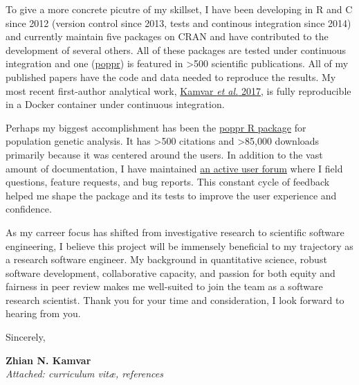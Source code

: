 To give a more concrete picutre of my skillset, I have been
developing in R and C since 2012 (version control since 2013, tests and
continous integration since 2014) and currently maintain five packages on CRAN
and have contributed to the development of several others. All of these
packages are tested under continuous integration and one
(\href{https://grunwaldlab.github.io/poppr}{poppr}) is featured in
\textgreater500 scientific publications. All of my published papers have the
code and data needed to reproduce the results. My most recent first-author
analytical work, \href{https://peerj.com/articles/4152/}{Kamvar \textit{et al.}
2017}, is fully reproducible in a Docker container under continuous
integration. 

\vspace{1ex}

Perhaps my biggest accomplishment has been the
\href{https://grunwaldlab.github.io/poppr}{poppr R package} for population
genetic analysis. It has \textgreater500 citations and \textgreater85,000
downloads primarily because it was centered around the users. In addition to
the vast amount of documentation, I have maintained
\href{https://groups.google.com/group/poppr}{an active user forum} where I
field questions, feature requests, and bug reports. This constant cycle of
feedback helped me shape the package and its tests to improve the user
experience and confidence.

\vspace{1ex}

As my carreer focus has shifted from investigative research to scientific
software engineering, I believe this project will be immensely beneficial to my
trajectory as a research software engineer. My background in quantitative
science, robust software development, collaborative capacity, and passion for
both equity and fairness in peer review makes me well-suited to join the team
as a software research scientist. Thank you for your time and consideration, I
look forward to hearing from you. 

\vspace{2ex}

Sincerely,

\vspace{5ex}

\textbf{Zhian N. Kamvar}\\
\textit{Attached: curriculum vit\ae{}, references}






